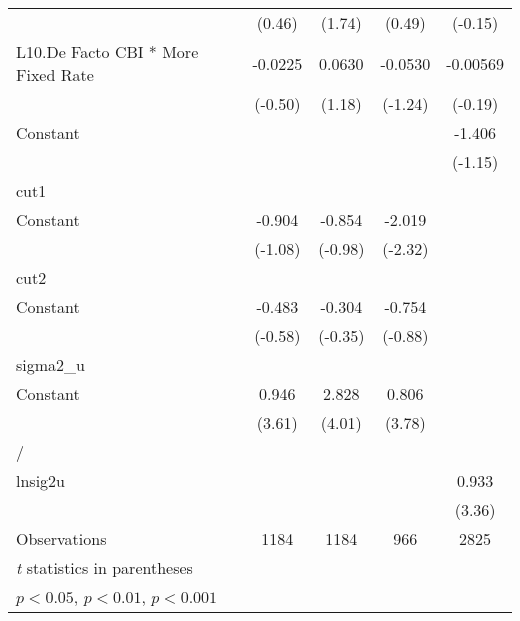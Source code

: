 {\begin{tabular}{l*{4}{c}}
                &   (0.46)         &   (1.74)         &   (0.49)         &  (-0.15)         \\
[1em]
L10.De Facto CBI * More Fixed Rate&  -0.0225         &   0.0630         &  -0.0530         & -0.00569         \\
                &  (-0.50)         &   (1.18)         &  (-1.24)         &  (-0.19)         \\
[1em]
Constant        &                  &                  &                  &   -1.406         \\
                &                  &                  &                  &  (-1.15)         \\
\hline
cut1            &                  &                  &                  &                  \\
Constant        &   -0.904         &   -0.854         &   -2.019\sym{*}  &                  \\
                &  (-1.08)         &  (-0.98)         &  (-2.32)         &                  \\
\hline
cut2            &                  &                  &                  &                  \\
Constant        &   -0.483         &   -0.304         &   -0.754         &                  \\
                &  (-0.58)         &  (-0.35)         &  (-0.88)         &                  \\
\hline
sigma2\_u        &                  &                  &                  &                  \\
Constant        &    0.946\sym{***}&    2.828\sym{***}&    0.806\sym{***}&                  \\
                &   (3.61)         &   (4.01)         &   (3.78)         &                  \\
\hline
/               &                  &                  &                  &                  \\
lnsig2u         &                  &                  &                  &    0.933\sym{***}\\
                &                  &                  &                  &   (3.36)         \\
\hline
Observations    &     1184         &     1184         &      966         &     2825         \\
\hline\hline
\multicolumn{5}{l}{\footnotesize \textit{t} statistics in parentheses}\\
\multicolumn{5}{l}{\footnotesize \sym{*} \(p<0.05\), \sym{**} \(p<0.01\), \sym{***} \(p<0.001\)}\\
\end{tabular}
}
